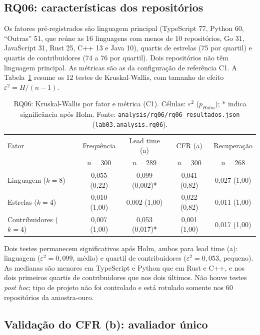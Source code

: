 \subsection{RQ06: características dos repositórios}

Os fatores pré-registrados são linguagem principal (TypeScript 77, Python 60,
``Outras'' 51, que reúne as 16 linguagens com menos de 10 repositórios, Go 31,
JavaScript 31, Rust 25, C++ 13 e Java 10), quartis de estrelas (75 por quartil)
e quartis de contribuidores (74 a 76 por quartil). Dois repositórios não têm
linguagem principal. As métricas são as da configuração de referência C1. A
Tabela~\ref{tab:rq06} resume os 12 testes de Kruskal-Wallis, com tamanho de
efeito $\varepsilon^2 = H/(n-1)$.

\begin{table}[ht]
\centering
\caption{RQ06: Kruskal-Wallis por fator e métrica (C1). Células: $\varepsilon^2$
($p_{Holm}$); * indica significância após Holm. Fonte:
\texttt{analysis/rq06/rq06\_resultados.json} (\texttt{lab03.analysis.rq06}).}
\label{tab:rq06}
\small
\begin{tabular}{lcccc}
\hline
Fator & Frequência & Lead time (a) & CFR (a) & Recuperação \\
 & $n = 300$ & $n = 289$ & $n = 300$ & $n = 268$ \\
\hline
Linguagem ($k = 8$) & 0,055 (0,22) & 0,099 (0,002)* & 0,041 (0,82) & 0,027 (1,00) \\
Estrelas ($k = 4$) & 0,010 (1,00) & 0,002 (1,00) & 0,022 (0,82) & 0,011 (1,00) \\
Contribuidores ($k = 4$) & 0,007 (1,00) & 0,053 (0,017)* & 0,001 (1,00) & 0,017 (1,00) \\
\hline
\end{tabular}
\end{table}

Dois testes permanecem significativos após Holm, ambos para lead time (a):
linguagem ($\varepsilon^2 = 0{,}099$, médio) e quartil de contribuidores
($\varepsilon^2 = 0{,}053$, pequeno). As medianas são menores em TypeScript e
Python que em Rust e C++, e nos dois primeiros quartis de contribuidores que
nos dois últimos. Não houve testes \textit{post hoc}; tipo de projeto não foi
controlado e está rotulado somente nos 60 repositórios da amostra-ouro.

\subsection{Validação do CFR (b): avaliador único}
\label{sec:validacao-cfrb}

